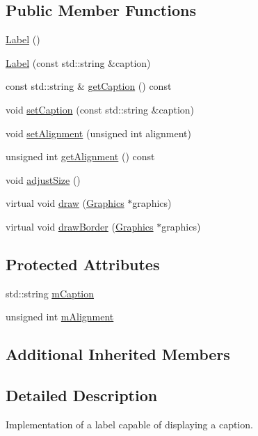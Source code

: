 \subsection*{Public Member Functions}
\begin{DoxyCompactItemize}
\item 
\hyperlink{classgcn_1_1Label_a82f9a1bb5dfa2936dd016806c5f628a2}{Label} ()
\item 
\hyperlink{classgcn_1_1Label_aba680408e8eeb8d95040809cecec4881}{Label} (const std\+::string \&caption)
\item 
const std\+::string \& \hyperlink{classgcn_1_1Label_abbf14d079c93a024a2d673cd8e18c6b8}{get\+Caption} () const 
\item 
void \hyperlink{classgcn_1_1Label_af17f617d0b4500dec5f09ba1d35463ba}{set\+Caption} (const std\+::string \&caption)
\item 
void \hyperlink{classgcn_1_1Label_aabcf9f7d28c743f378803aac5b3580e7}{set\+Alignment} (unsigned int alignment)
\item 
unsigned int \hyperlink{classgcn_1_1Label_afdf8e5bce3c95f8e737bce4b78f66132}{get\+Alignment} () const 
\item 
void \hyperlink{classgcn_1_1Label_a300b8388c26af668dec996f910d81912}{adjust\+Size} ()
\item 
virtual void \hyperlink{classgcn_1_1Label_a46b49030a7c72393c2960c6355574ab0}{draw} (\hyperlink{classgcn_1_1Graphics}{Graphics} $\ast$graphics)
\item 
virtual void \hyperlink{classgcn_1_1Label_aa43832b869987ff3e44f3ea8d004ddd3}{draw\+Border} (\hyperlink{classgcn_1_1Graphics}{Graphics} $\ast$graphics)
\end{DoxyCompactItemize}
\subsection*{Protected Attributes}
\begin{DoxyCompactItemize}
\item 
std\+::string \hyperlink{classgcn_1_1Label_a28ee6b71529d6bd7e662c01449b6b4d5}{m\+Caption}
\item 
unsigned int \hyperlink{classgcn_1_1Label_a2558f49c5f6ff298242cc920a8865dc1}{m\+Alignment}
\end{DoxyCompactItemize}
\subsection*{Additional Inherited Members}


\subsection{Detailed Description}
Implementation of a label capable of displaying a caption. 

